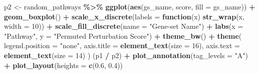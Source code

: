 \documentclass[9pt,a4paper,]{extarticle}
\newenvironment{Shaded}{\begin{snugshade}}{\end{snugshade}}
\newcommand{\AttributeTok}[1]{\textcolor[rgb]{0.13,0.29,0.53}{#1}}
\newcommand{\ControlFlowTok}[1]{\textcolor[rgb]{0.13,0.29,0.53}{\textbf{#1}}}
\newcommand{\DecValTok}[1]{\textcolor[rgb]{0.00,0.00,0.81}{#1}}
\newcommand{\FloatTok}[1]{\textcolor[rgb]{0.00,0.00,0.81}{#1}}
\newcommand{\FunctionTok}[1]{\textcolor[rgb]{0.13,0.29,0.53}{\textbf{#1}}}
\newcommand{\NormalTok}[1]{#1}
\newcommand{\OtherTok}[1]{\textcolor[rgb]{0.56,0.35,0.01}{#1}}
\newcommand{\SpecialCharTok}[1]{\textcolor[rgb]{0.81,0.36,0.00}{\textbf{#1}}}
\newcommand{\StringTok}[1]{\textcolor[rgb]{0.31,0.60,0.02}{#1}}
\begin{document}
\begin{Shaded}
\begin{Highlighting}[]
\NormalTok{p2 }\OtherTok{\textless{}{-}}\NormalTok{ random\_pathways }\SpecialCharTok{\%\textgreater{}\%}
    \FunctionTok{ggplot}\NormalTok{(}\FunctionTok{aes}\NormalTok{(gs\_name, score, }\AttributeTok{fill =}\NormalTok{ gs\_name)) }\SpecialCharTok{+}
    \FunctionTok{geom\_boxplot}\NormalTok{() }\SpecialCharTok{+}
    \FunctionTok{scale\_x\_discrete}\NormalTok{(}\AttributeTok{labels =} \ControlFlowTok{function}\NormalTok{(x) }\FunctionTok{str\_wrap}\NormalTok{(x, }\AttributeTok{width =} \DecValTok{10}\NormalTok{)) }\SpecialCharTok{+}
    \FunctionTok{scale\_fill\_discrete}\NormalTok{(}\AttributeTok{name =} \StringTok{"Gene{-}set Name"}\NormalTok{) }\SpecialCharTok{+} 
    \FunctionTok{labs}\NormalTok{(}\AttributeTok{x =} \StringTok{"Pathway"}\NormalTok{, }\AttributeTok{y =} \StringTok{"Permuted Perturbation Score"}\NormalTok{) }\SpecialCharTok{+}
    \FunctionTok{theme\_bw}\NormalTok{() }\SpecialCharTok{+} 
    \FunctionTok{theme}\NormalTok{(}
      \AttributeTok{legend.position =} \StringTok{"none"}\NormalTok{, }
      \AttributeTok{axis.title =} \FunctionTok{element\_text}\NormalTok{(}\AttributeTok{size =} \DecValTok{16}\NormalTok{), }
      \AttributeTok{axis.text =} \FunctionTok{element\_text}\NormalTok{(}\AttributeTok{size =} \DecValTok{14}\NormalTok{)}
\NormalTok{    )}
\NormalTok{(p1 }\SpecialCharTok{/}\NormalTok{ p2) }\SpecialCharTok{+}
    \FunctionTok{plot\_annotation}\NormalTok{(}\AttributeTok{tag\_levels =} \StringTok{"A"}\NormalTok{) }\SpecialCharTok{+}
    \FunctionTok{plot\_layout}\NormalTok{(}\AttributeTok{heights =} \FunctionTok{c}\NormalTok{(}\FloatTok{0.6}\NormalTok{, }\FloatTok{0.4}\NormalTok{))}
\end{Highlighting}
\end{Shaded}
\end{document}
